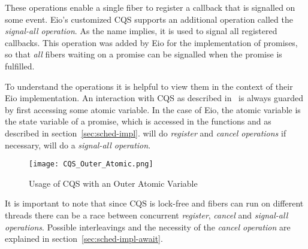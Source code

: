 
These operations enable a single fiber to register a callback that is signalled on some event.
Eio's customized CQS supports an additional operation called the \emph{signal-all operation}.
As the name implies, it is used to signal all registered callbacks.
This operation was added by Eio for the implementation of promises, so that \emph{all} fibers waiting on a promise can be signalled when the promise is fulfilled.


To understand the operations it is helpful to view them in the context of their Eio implementation.
An interaction with CQS as described in~\cite{koval2023cqs} is always guarded by first accessing some atomic variable.
In the case of Eio, the atomic variable is the state variable of a promise, which is accessed in the functions  and  as described in section~\ref{sec:sched-impl}.
 will do \emph{register} and \emph{cancel operations} if necessary,  will do a \emph{signal-all operation}.

\begin{figure}[ht]
  \texttt{[image: CQS\_Outer\_Atomic.png]}
  \caption{Usage of CQS with an Outer Atomic Variable}
\end{figure}

It is important to note that since CQS is lock-free and fibers can run on different threads there can be a race between concurrent \emph{register}, \emph{cancel} and \emph{signal-all operations}.
Possible interleavings and the necessity of the \emph{cancel operation} are explained in section~\ref{sec:sched-impl-await}.




